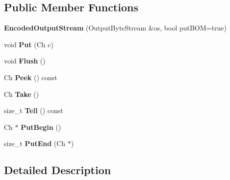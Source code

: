 \subsection*{Public Member Functions}
\begin{DoxyCompactItemize}
\item 
{\bfseries Encoded\+Output\+Stream} (Output\+Byte\+Stream \&os, bool put\+B\+OM=true)\hypertarget{classEncodedOutputStream_ad3360c613a30a6a15526ae9ad63bd004}{}\label{classEncodedOutputStream_ad3360c613a30a6a15526ae9ad63bd004}

\item 
void {\bfseries Put} (Ch c)\hypertarget{classEncodedOutputStream_a0f3c00f94c195a38d78c05ecda497481}{}\label{classEncodedOutputStream_a0f3c00f94c195a38d78c05ecda497481}

\item 
void {\bfseries Flush} ()\hypertarget{classEncodedOutputStream_a657188f6a9f0fae01a4012c288d3fd46}{}\label{classEncodedOutputStream_a657188f6a9f0fae01a4012c288d3fd46}

\item 
Ch {\bfseries Peek} () const \hypertarget{classEncodedOutputStream_aa1dbe6b921fe788f3229024fb5598647}{}\label{classEncodedOutputStream_aa1dbe6b921fe788f3229024fb5598647}

\item 
Ch {\bfseries Take} ()\hypertarget{classEncodedOutputStream_a90f5a5e1598316a417ef5b6ad3d49f36}{}\label{classEncodedOutputStream_a90f5a5e1598316a417ef5b6ad3d49f36}

\item 
size\+\_\+t {\bfseries Tell} () const \hypertarget{classEncodedOutputStream_ab580ac97f1a22c2a6abc4a31bb5c8272}{}\label{classEncodedOutputStream_ab580ac97f1a22c2a6abc4a31bb5c8272}

\item 
Ch $\ast$ {\bfseries Put\+Begin} ()\hypertarget{classEncodedOutputStream_a78934de4f76c9fa65238e65d3630cbc5}{}\label{classEncodedOutputStream_a78934de4f76c9fa65238e65d3630cbc5}

\item 
size\+\_\+t {\bfseries Put\+End} (Ch $\ast$)\hypertarget{classEncodedOutputStream_a818695f6d3fa8896e9d7d0fbdc7d4514}{}\label{classEncodedOutputStream_a818695f6d3fa8896e9d7d0fbdc7d4514}

\end{DoxyCompactItemize}


\subsection{Detailed Description}
